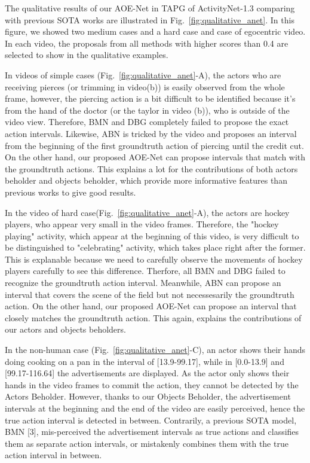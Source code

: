 \documentclass[sn-mathphys]{sn-jnl}
\theoremstyle{thmstyleone}\newtheorem{theorem}{Theorem}\newtheorem{proposition}[theorem]{Proposition}
\theoremstyle{thmstyletwo}\newtheorem{example}{Example}\newtheorem{remark}{Remark}
\theoremstyle{thmstylethree}\newtheorem{definition}{Definition}
\begin{document}
The qualitative results of our AOE-Net in TAPG of ActivityNet-1.3 \cite{caba2015activitynet} comparing with previous SOTA works \cite{bmn, dbg, KhoaVo_Access} are illustrated in Fig.~\ref{fig:qualitative_anet}. In this figure, we showed two medium cases and a hard case and case of egocentric video. In each video, the proposals from all methods with higher scores than 0.4 are selected to show in the qualitative examples.

In videos of simple cases (Fig.~\ref{fig:qualitative_anet}-A), the actors who are receiving pierces (or trimming in video(b)) is easily observed from the whole frame, however, the piercing action is a bit difficult to be identified because it's from the hand of the doctor (or the taylor in video (b)), who is outside of the video view. Therefore, BMN \cite{bmn} and DBG \cite{dbg} completely failed to propose the exact action intervals. Likewise, ABN \cite{KhoaVo_Access} is tricked by the video and proposes an interval from the beginning of the first groundtruth action of piercing until the credit cut. On the other hand, our proposed AOE-Net can propose intervals that match with the groundtruth actions. This explains a lot for the contributions of both actors beholder and objects beholder, which provide more informative features than previous works to give good results.

In the video of hard case(Fig.~\ref{fig:qualitative_anet}-A), the actors are hockey players, who appear very small in the video frames. Therefore, the "hockey playing" activity, which appear at the beginning of this video, is very difficult to be distinguished to "celebrating" activity, which takes place right after the former. This is explanable because we need to carefully observe the movements of hockey players carefully to see this difference. Therfore, all BMN and DBG failed to recognize the groundtruth action interval. Meanwhile, ABN can propose an interval that covers the scene of the field but not necessesarily the groundtruth action. On the other hand, our proposed AOE-Net can propose an interval that closely matches the groundtruth action. This again, explains the contributions of our actors and objects beholders.

In the non-human case (Fig.~\ref{fig:qualitative_anet}-C), an actor shows their hands doing cooking on a pan in the interval of [13.9-99.17], while in [0.0-13.9] and [99.17-116.64] the advertisements are displayed. As the actor only shows their hands in the video frames to commit the action, they cannot be detected by the Actors Beholder. However, thanks to our Objects Beholder, the advertisement intervals at the beginning and the end of the video are easily perceived, hence the true action interval is detected in between. Contrarily, a previous SOTA model, BMN [3], mis-perceived the advertisement intervals as true actions and classifies them as separate action intervals, or mistakenly combines them with the true action interval in between.
\end{document}
